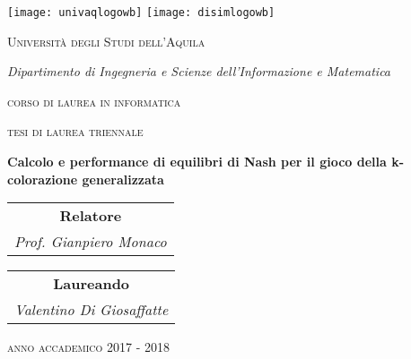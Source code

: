 \begin{titlepage}

\begin{center}

\texttt{[image: univaqlogowb]}
\hfill
\texttt{[image: disimlogowb]}

\vspace{1.5cm}

{\scshape\LARGE Università degli Studi dell'Aquila \\}

\vspace{0.5cm}

{\itshape\large Dipartimento di Ingegneria e Scienze dell'Informazione e Matematica \\}

\vspace{0.5cm}

{\scshape\Large corso di laurea in informatica \\}

\vspace{1cm}

{\scshape\Large tesi di laurea triennale \\}

\vspace{1cm}

{\huge\bfseries Calcolo e performance di equilibri di Nash per il gioco della k-colorazione generalizzata \\}

\vfill

\begin{tabular}{c}

	\textbf{Relatore} \\
	\textit{Prof. Gianpiero Monaco}

\end{tabular}
\hfill
\begin{tabular}{c}

	\textbf{Laureando}\\
	\textit{Valentino Di Giosaffatte}

\end{tabular}

\vfill

{\scshape\Large anno accademico }{\scshape\large 2017 - 2018}


\end{center}

\end{titlepage}
